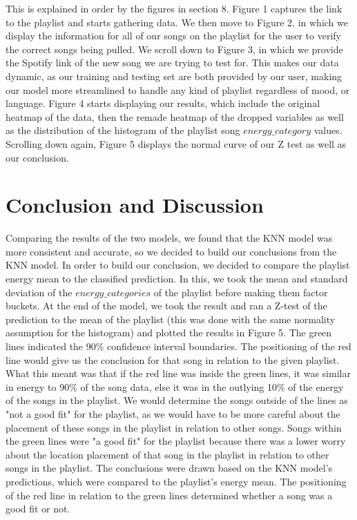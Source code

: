 \documentclass[titlepage]{article}
\begin{document}
This is explained in order by the figures in section 8. Figure 1 captures the link to the playlist and starts gathering data. We then move to Figure 2, in which we display the information for all of our songs on the playlist for the user to verify the correct songs being pulled. We scroll down to Figure 3, in which we provide the Spotify link of the new song we are trying to test for. This makes our data dynamic, as our training and testing set are both provided by our user, making our model more streamlined to handle any kind of playlist regardless of mood, or language. Figure 4 starts displaying our results, which include the original heatmap of the data, then the remade heatmap of the dropped variables as well as the distribution of the histogram of the playlist song $energy\_category$ values. Scrolling down again, Figure 5 displays the normal curve of our Z test as well as our conclusion.


\section{Conclusion and Discussion}
Comparing the results of the two models, we found that the KNN model was more consistent and accurate, so we decided to build our conclusions from the KNN model. In order to build our conclusion, we decided to compare the playlist energy mean to the classified prediction. In this, we took the mean and standard deviation of the $energy\_categories$ of the playlist before making them factor buckets. At the end of the model, we took the result and ran a Z-test of the prediction to the mean of the playlist (this was done with the same normality assumption for the histogram) and plotted the results in Figure 5. The green lines indicated the 90\% confidence interval boundaries. The positioning of the red line would give us the conclusion for that song in relation to the given playlist. What this meant was that if the red line was inside the green lines, it was similar in energy to 90\% of the song data, else it was in the outlying 10\% of the energy of the songs in the playlist. We would determine the songs outside of the lines as "not a good fit" for the playlist, as we would have to be more careful about the placement of these songs in the playlist in relation to other songs. Songs within the green lines were "a good fit" for the playlist because there was a lower worry about the location placement of that song in the playlist in relation to other songs in the playlist.                                                                                                                               The conclusions were drawn based on the KNN model's predictions, which were compared to the playlist's energy mean. The positioning of the red line in relation to the green lines determined whether a song was a good fit or not.
\end{document}
